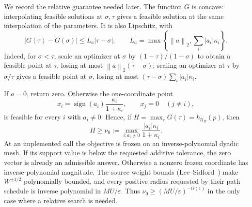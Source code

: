 \documentclass[11pt]{article}
\theoremstyle{definition}
\newcommand{\eps}{\varepsilon}
\newcommand{\norm}[1]{\left\lVert #1\right\rVert}
\newcommand{\set}[1]{\left\{#1\right\}}
\newcommand{\defeq}{\mathrel{:=}}
\begin{document}
We record the relative guarantee needed later.  The function $G$ is concave:
interpolating feasible solutions at $\sigma,\tau$ gives a feasible solution at the
same interpolation of the parameters.  It is also Lipschitz, with
\begin{equation}\label{eq:mixed-value-lipschitz}
 |G(\tau)-G(\sigma)|\le L_a|\tau-\sigma|,
 \qquad L_a=\max\set{\norm{a}_2,\sum_i|a_i|\kappa_i}.
\end{equation}
Indeed, for $\sigma<\tau$, scale an optimizer at $\sigma$ by
$(1-\tau)/(1-\sigma)$ to obtain a feasible point at $\tau$, losing at most
$\norm{a}_2(\tau-\sigma)$; scaling an optimizer at $\tau$ by
$\sigma/\tau$ gives a feasible point at $\sigma$, losing at most
$(\tau-\sigma)\sum_i|a_i|\kappa_i$.

If $a=0$, return zero.  Otherwise the one-coordinate point
\[
 x_i=\operatorname{sign}(a_i)\frac{\kappa_i}{1+\kappa_i},
 \qquad x_j=0\quad(j\ne i),
\]
is feasible for every $i$ with $a_i\ne0$.  Hence, if
$H=\max_{\tau}G(\tau)=h_{\mathcal U_R}(p)$, then
\begin{equation}\label{eq:mixed-support-lower-bound}
 H\ge\nu_0\defeq
 \max_{i:a_i\ne0}\frac{|a_i|\kappa_i}{1+\kappa_i}.
\end{equation}
At an implemented call the objective is frozen on an inverse-polynomial
dyadic mesh.  If its support value is below the requested additive tolerance,
the zero vector is already an admissible answer.  Otherwise a nonzero frozen
coordinate has inverse-polynomial magnitude.  The source weight bounds
(Lee--Sidford~\cite[Lemma~67]{LeeSidford2020}) make
$W^{\pm1/2}$ polynomially bounded, and every positive radius requested by
their path schedule is inverse polynomial in $MU/\eps$.  Thus
$\nu_0\ge(MU/\eps)^{-O(1)}$ in the only case where a relative search is
needed.
\end{document}
